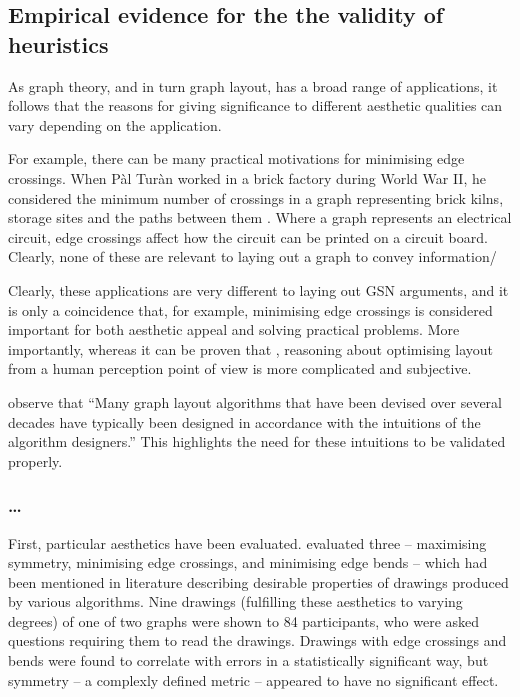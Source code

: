 \subsection{Empirical evidence for the the validity of heuristics}

As graph theory, and in turn graph layout, has a broad range of applications, it follows that the reasons for giving significance to different aesthetic qualities can vary depending on the application.

For example, there can be many practical motivations for minimising edge crossings.
When P\`{a}l Tur\`{a}n worked in a brick factory during World War II,
he considered the minimum number of crossings in a graph representing
brick kilns, storage sites and the paths between them .
Where a graph represents an electrical circuit, edge crossings affect how the circuit can be printed on a circuit board.
Clearly, none of these are relevant to laying out a graph to convey information/

Clearly, these applications are very different to laying out GSN arguments, and it is only a coincidence that, for example, minimising edge crossings is considered important for both aesthetic appeal and solving practical problems.
More importantly, whereas it can be proven that , reasoning about optimising layout from a human perception point of view is more complicated and subjective.

\citet{5674033} observe that ``Many graph layout algorithms that have been devised over
several decades have typically been designed in accordance with the intuitions of the algorithm designers.''
This highlights the need for these intuitions to be validated properly.

\subsubsection{\ldots}

First, particular aesthetics have been evaluated. \citet{Purchase1997basis} evaluated three -- maximising symmetry, minimising edge crossings, and minimising edge bends -- which had been mentioned in literature describing desirable properties of drawings produced by various algorithms. 
Nine drawings (fulfilling these aesthetics to varying degrees) of one of two graphs were shown to 84 participants,
who were asked questions requiring them to read the drawings.
Drawings with edge crossings and bends were found to correlate with errors in a statistically significant way, but symmetry -- a complexly defined metric -- appeared to have no significant effect.

